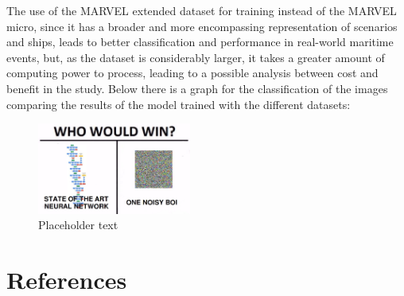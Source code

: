 \documentclass[a4paper,12pt]{article}
\begin{document}
\begin{multicols}{2}

The use of the MARVEL extended dataset for training instead of the MARVEL micro, since it has a broader and more encompassing representation of scenarios and ships, leads to better classification and performance in real-world maritime events, but, as the dataset is considerably larger, it takes a greater amount of computing power to process, leading to a possible analysis between cost and benefit in the study. Below there is a graph for the classification of the images comparing the results of the model trained with the different datasets:

\begin{figure}[H]
    \centering
    \includegraphics[width=0.45\textwidth]{placeholder.png}
    \caption{Placeholder text}
    \label{}
\end{figure}


\section{References}\label{sec:references}
\printbibliography
\end{multicols}
\end{document}
